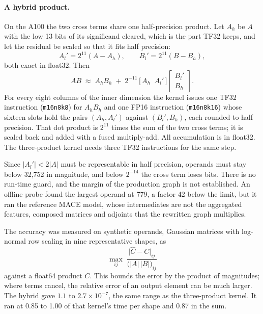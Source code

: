 \documentclass[11pt]{article}
\begin{document}
\paragraph{A hybrid product.}
On the A100 the two cross terms share one half-precision product. Let $A_h$ be $A$ with the low 13 bits of its
significand cleared, which is the part TF32 keeps, and let the residual be scaled so that it fits half precision:
\begin{equation}
A_l' = 2^{11}(A - A_h), \qquad B_l' = 2^{11}(B - B_h),
\end{equation}
both exact in float32. Then
\begin{equation}
AB \;\approx\; A_h B_h \;+\; 2^{-11}\,\bigl[\,A_h \;\; A_l'\,\bigr]\!\begin{bmatrix} B_l' \\ B_h \end{bmatrix} .
\end{equation}
For every eight columns of the inner dimension the kernel issues one TF32 instruction (\texttt{m16n8k8}) for
$A_h B_h$ and one FP16 instruction (\texttt{m16n8k16}) whose sixteen slots hold the pairs $(A_h, A_l')$ against
$(B_l', B_h)$, each rounded to half precision. That dot product is $2^{11}$ times the sum of the two cross
terms; it is scaled back and added with a fused multiply-add. All accumulation is in float32. The three-product
kernel needs three TF32 instructions for the same step.

Since $|A_l'| < 2|A|$ must be representable in half precision, operands must stay below 32{,}752 in magnitude,
and below $2^{-14}$ the cross term loses bits. There is no run-time guard, and the margin of the production
graph is not established. An offline probe found the largest operand at 779, a factor 42 below the limit, but
it ran the reference MACE model, whose intermediates are not the aggregated features, composed matrices and
adjoints that the rewritten graph multiplies.

The accuracy was measured on synthetic operands, Gaussian matrices with log-normal row scaling in nine
representative shapes, as
\begin{equation}
\max_{ij}\; \frac{\bigl|\widehat C - C\bigr|_{ij}}{\bigl(|A|\,|B|\bigr)_{ij}}
\end{equation}
against a float64 product $C$. This bounds the error by the product of magnitudes; where terms cancel, the
relative error of an output element can be much larger. The hybrid gave $1.1$ to $2.7\times10^{-7}$, the same
range as the three-product kernel. It ran at 0.85 to 1.00 of that kernel's time per shape and 0.87 in the sum.
\end{document}
